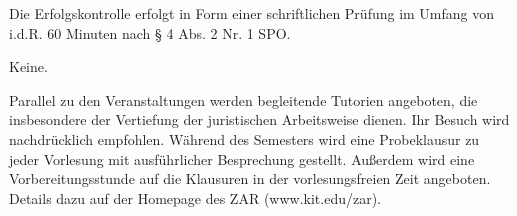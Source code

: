 \begin{course}

\setdoclanguagegerman
{}



\coursehead


\label{cour_4391.dp_997}


\begin{styleenv}
\begin{assessment}
Die Erfolgskontrolle erfolgt in Form einer schriftlichen Prüfung im Umfang von i.d.R. 60 Minuten nach § 4 Abs. 2 Nr. 1 SPO.


\end{assessment}

\begin{conditions}Keine.\end{conditions}

\begin{recommendations}Parallel zu den Veranstaltungen werden begleitende Tutorien angeboten, die insbesondere der Vertiefung der juristischen Arbeitsweise dienen. Ihr Besuch wird nachdrücklich empfohlen.\newline
Während des Semesters wird eine Probeklausur zu jeder Vorlesung mit ausführlicher Besprechung gestellt. Außerdem wird eine Vorbereitungsstunde auf die Klausuren in der vorlesungsfreien Zeit angeboten.\newline
Details dazu auf der Homepage des ZAR (www.kit.edu/zar).

\end{recommendations}
\end{styleenv}


\end{course}
